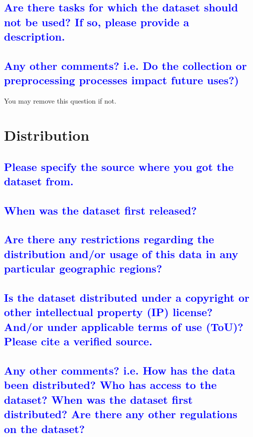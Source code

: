 \documentclass[letterpaper, 10 pt, conference]{ieeeconf}  %
\begin{document}
\textcolor{blue}{\subsection{Are there tasks for which the dataset should not be used? If so, please provide a description.}}
\lipsum[1]

\textcolor{blue}{\subsection{Any other comments? i.e. Do the collection or preprocessing processes impact future uses?)}}

You may remove this question if not.
\\



\section{Distribution}

\textcolor{blue}{\subsection{Please specify the source where you got the dataset from.}}
\lipsum[1]

\textcolor{blue}{\subsection{When was the dataset first released?}}
\lipsum[1]

\textcolor{blue}{\subsection{Are there any restrictions regarding the distribution and/or usage of this data in any particular geographic regions?}}
\lipsum[1]

\textcolor{blue}{\subsection{Is the dataset distributed under a copyright or other intellectual property (IP) license? And/or under applicable terms of use (ToU)? Please cite a verified source.}}
\lipsum[1]


\textcolor{blue}{\subsection{Any other comments? i.e. How has the data been distributed? Who has access to the dataset? When was the dataset first distributed? Are there any other regulations on the dataset?}}
\end{document}
